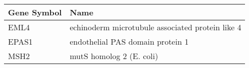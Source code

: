 \begin{tabular}{ll}
\toprule
Gene Symbol &                                             Name \\
\midrule
       EML4 & echinoderm microtubule associated protein like 4 \\
      EPAS1 &                 endothelial PAS domain protein 1 \\
       MSH2 &                         mutS homolog 2 (E. coli) \\
\bottomrule
\end{tabular}
